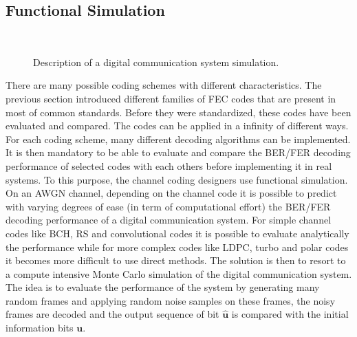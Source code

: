 \subsection{Functional Simulation}
\label{sec:ctx_simulation}

\begin{figure}[htp]
  \centering
  \\
  \caption{Description of a digital communication system simulation.}
  \label{fig:ctx_simu_com_chain}
\end{figure}

There are many possible coding schemes with different characteristics. The
previous section introduced different families of FEC codes that are present in
most of common standards. Before they were standardized, these codes have been
evaluated and compared. The codes can be applied in a infinity of different
ways. For each coding scheme, many different decoding algorithms can be
implemented. It is then mandatory to be able to evaluate and compare the BER/FER
decoding performance of selected codes with each others before implementing it
in real systems. To this purpose, the channel coding designers use functional
simulation. On an AWGN channel, depending on the channel code it is possible to
predict with varying degrees of ease (in term of computational effort) the
BER/FER decoding performance of a digital communication system. For simple
channel codes like BCH, RS and convolutional codes it is possible to evaluate
analytically the performance while for more complex codes like LDPC, turbo and
polar codes it becomes more difficult to use direct methods. The solution is
then to resort to a compute intensive Monte Carlo simulation of the digital
communication system. The idea is to evaluate the performance of the system by
generating many random frames and applying random noise samples on these frames,
the noisy frames are decoded and the output sequence of bit $\bm{\hat{u}}$ is
compared with the initial information bits $\bm{u}$.

